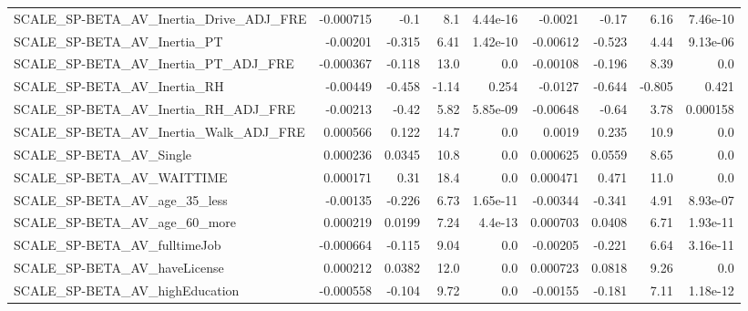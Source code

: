 \begin{tabular}{lrrrrrrrr}
SCALE\_SP-BETA\_AV\_Inertia\_Drive\_ADJ\_FRE             &   -0.000715 &         -0.1 &      8.1 & 4.44e-16 &    -0.0021 &       -0.17 &         6.16 &      7.46e-10 \\
SCALE\_SP-BETA\_AV\_Inertia\_PT                        &    -0.00201 &       -0.315 &     6.41 & 1.42e-10 &   -0.00612 &      -0.523 &         4.44 &      9.13e-06 \\
SCALE\_SP-BETA\_AV\_Inertia\_PT\_ADJ\_FRE                &   -0.000367 &       -0.118 &     13.0 &      0.0 &   -0.00108 &      -0.196 &         8.39 &           0.0 \\
SCALE\_SP-BETA\_AV\_Inertia\_RH                        &    -0.00449 &       -0.458 &    -1.14 &    0.254 &    -0.0127 &      -0.644 &       -0.805 &         0.421 \\
SCALE\_SP-BETA\_AV\_Inertia\_RH\_ADJ\_FRE                &    -0.00213 &        -0.42 &     5.82 & 5.85e-09 &   -0.00648 &       -0.64 &         3.78 &      0.000158 \\
SCALE\_SP-BETA\_AV\_Inertia\_Walk\_ADJ\_FRE              &    0.000566 &        0.122 &     14.7 &      0.0 &     0.0019 &       0.235 &         10.9 &           0.0 \\
SCALE\_SP-BETA\_AV\_Single                            &    0.000236 &       0.0345 &     10.8 &      0.0 &   0.000625 &      0.0559 &         8.65 &           0.0 \\
SCALE\_SP-BETA\_AV\_WAITTIME                          &    0.000171 &         0.31 &     18.4 &      0.0 &   0.000471 &       0.471 &         11.0 &           0.0 \\
SCALE\_SP-BETA\_AV\_age\_35\_less                       &    -0.00135 &       -0.226 &     6.73 & 1.65e-11 &   -0.00344 &      -0.341 &         4.91 &      8.93e-07 \\
SCALE\_SP-BETA\_AV\_age\_60\_more                       &    0.000219 &       0.0199 &     7.24 &  4.4e-13 &   0.000703 &      0.0408 &         6.71 &      1.93e-11 \\
SCALE\_SP-BETA\_AV\_fulltimeJob                       &   -0.000664 &       -0.115 &     9.04 &      0.0 &   -0.00205 &      -0.221 &         6.64 &      3.16e-11 \\
SCALE\_SP-BETA\_AV\_haveLicense                       &    0.000212 &       0.0382 &     12.0 &      0.0 &   0.000723 &      0.0818 &         9.26 &           0.0 \\
SCALE\_SP-BETA\_AV\_highEducation                     &   -0.000558 &       -0.104 &     9.72 &      0.0 &   -0.00155 &      -0.181 &         7.11 &      1.18e-12 \\

\end{tabular}
